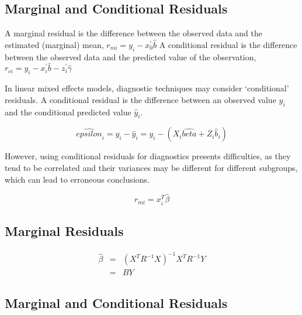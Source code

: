 \documentclass[Main.tex]{subfiles}
\begin{document}

\subsection{Marginal and Conditional Residuals}

A marginal residual is the difference between the observed data and the estimated (marginal) mean, $r_{mi} = y_i - x_0^{\prime} \hat{b}$
A conditional residual is the difference between the observed data and the predicted value of the observation,
$r_{ci} = y_i - x_i^{\prime} \hat{b} - z_i^{\prime} \hat{\gamma}$

In linear mixed effects models, diagnostic techniques may consider `conditional' residuals. A conditional residual is the difference between an observed value $y_{i}$ and the conditional predicted value $\hat{y}_{i} $.

\[ \hat{epsilon}_{i} = y_{i} - \hat{y}_{i} = y_{i} - ( X_{i}\hat{beta} + Z_{i}\hat{b}_{i}) \]

However, using conditional residuals for diagnostics presents difficulties, as they tend to be correlated and their variances may be different for different subgroups, which can lead to erroneous conclusions.







\begin{equation}
r_{mi}=x^{T}_{i}\hat{\beta}
\end{equation}

\subsection{Marginal Residuals}
\begin{eqnarray}
\hat{\beta} &=& (X^{T}R^{-1}X)^{-1}X^{T}R^{-1}Y \nonumber \\
&=& BY \nonumber
\end{eqnarray}



	\subsection{Marginal and Conditional Residuals}
	
\end{document}
